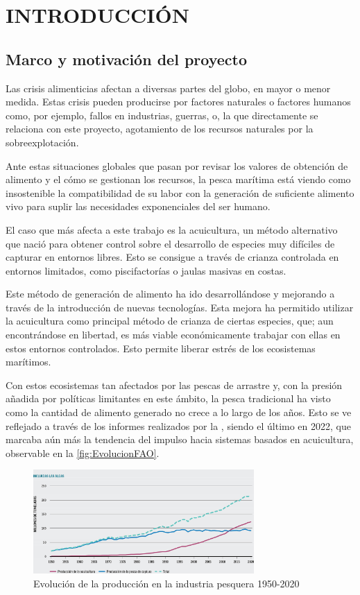 \section{INTRODUCCIÓN}

\subsection{Marco y motivación del proyecto}

Las crisis alimenticias afectan a diversas partes del globo, en mayor o menor medida. Estas crisis pueden producirse por factores naturales o factores humanos como, por ejemplo, 
fallos en industrias, guerras, o, la que directamente se relaciona con este proyecto, agotamiento de los recursos naturales por la sobreexplotación.

Ante estas situaciones globales que pasan por revisar los valores de obtención de alimento y el cómo se gestionan los recursos, la pesca marítima está viendo como insostenible la 
compatibilidad de su labor con la generación de suficiente alimento vivo para suplir las necesidades exponenciales del ser humano.

El caso que más afecta a este trabajo es la acuicultura, un método alternativo que nació para obtener control sobre el desarrollo de especies muy difíciles de capturar en entornos 
libres. Esto se consigue a través de crianza controlada en entornos limitados, como piscifactorías o jaulas masivas en costas.

Este método de generación de alimento ha ido desarrollándose y mejorando a través de la introducción de nuevas tecnologías. Esta mejora ha permitido utilizar la acuicultura 
como principal método de crianza de ciertas especies, que; aun encontrándose en libertad, es más viable económicamente trabajar con ellas en estos entornos controlados. Esto permite liberar 
estrés de los ecosistemas marítimos.

Con estos ecosistemas tan afectados por las pescas de arrastre y, con la presión añadida por políticas limitantes en este ámbito, la pesca tradicional ha visto como la cantidad de alimento 
generado no crece a lo largo de los años. Esto se ve reflejado a través de los informes realizados por la \textit{}, siendo el último en 2022, que marcaba aún más la tendencia del 
impulso hacia sistemas basados en acuicultura, observable en la \autoref{fig:EvolucionFAO}.

\begin{figure}[h]
    \centering
    \includegraphics[width=0.75\textwidth]{images/2/EvolucionFAO.jpg}
    \caption{Evolución de la producción en la industria pesquera 1950-2020\cite{EstadoMundialPesca}}
    \label{fig:EvolucionFAO}
\end{figure}

